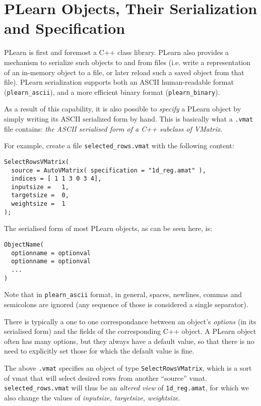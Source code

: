 \documentclass[11pt]{book}
\begin{document}
\section{PLearn Objects, Their Serialization and Specification}

PLearn is first and foremost a C++ class library. PLearn also provides a
mechanism to serialize such objects to and from files (i.e. write a
representation of an in-memory object to a file, or later reload such a
saved object from that file). PLearn serialization supports both an ASCII
human-readable format (\verb!plearn_ascii!), and a more efficient binary format (\verb!plearn_binary!).

As a result of this capability, it is also possible to {\em specify} a
PLearn object by simply writing its ASCII serialized form by hand. 
This is basically what a {\tt .vmat} file contains: {\em the ASCII serialised form of a C++ subclass of VMatrix}.

For example, create a file \verb!selected_rows.vmat! with the following content:

\begin{verbatim}
SelectRowsVMatrix(
  source = AutoVMatrix( specification = "1d_reg.amat" ),
  indices = [ 1 1 3 0 3 4],
  inputsize =   1,
  targetsize =  0,
  weightsize =  1
);
\end{verbatim}

The serialised form of most PLearn objects, as can be seen here, is:
\begin{verbatim}
ObjectName(  
  optionname = optionval
  optionname = optionval
  ...
)
\end{verbatim}

Note that in \verb!plearn_ascii! format, in general, spaces, newlines, commas and semicolons
are ignored (any sequence of those is considered a single separator).

There is typically a one to one correspondance between an object's {\em
  options} (in its serialised form) and the fields of the corresponding C++
object. A PLearn object often has many options, but they always have a default value,
so that there is no need to explicitly set those for which the default value is fine.

The above {\tt .vmat} specifies an object of type {\tt SelectRowsVMatrix},
which is a sort of vmat that will select desired rows from another
``source'' vmat.  \verb!selected_rows.vmat! will thus be an {\em altered
  view} of \verb!1d_reg.amat!, for which we also change the values of {\em
  inputsize, targetsize, weightsize}.
\end{document}
